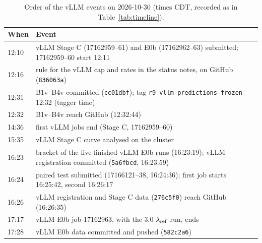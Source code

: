\begin{table}[htbp]
\centering\footnotesize
\caption{Order of the vLLM events on 2026-10-30 (times CDT, recorded as in Table~\ref{tab:timeline}).}\label{tab:timeline-vllm}
\begin{tabular}{@{}p{1.75cm} >{\raggedright\arraybackslash}p{5.6cm}@{}}
\toprule
When & Event\\
\midrule
12:10 & vLLM Stage C (17162959--61) and E0b (17162962--63) submitted; 17162959--60 start 12:11\\
12:16 & rule for the vLLM cap and rates in the status notes, on GitHub (\texttt{836063a})\\
12:31 & B1v--B4v committed (\texttt{cc01dbf}); tag \texttt{r9-vllm-predictions-frozen} 12:32 (tagger time)\\
12:32 & B1v--B4v reach GitHub (12:32:44)\\
14:36 & first vLLM jobs end (Stage C, 17162959--60)\\
15:35 & vLLM Stage C curve analysed on the cluster\\
16:23 & bracket of the five finished vLLM E0b runs (16:23:19); vLLM registration committed (\texttt{5a6fbcd}, 16:23:59)\\
16:24 & paired test submitted (17166121--38, 16:24:36); first job starts 16:25:42, second 16:26:17\\
16:26 & vLLM registration and Stage C data (\texttt{276c5f0}) reach GitHub (16:26:35)\\
17:17 & vLLM E0b job 17162963, with the 3.0 $\lambda_{\mathrm{ref}}$ run, ends\\
17:28 & vLLM E0b data committed and pushed (\texttt{582c2a6})\\
\bottomrule
\end{tabular}
\end{table}

